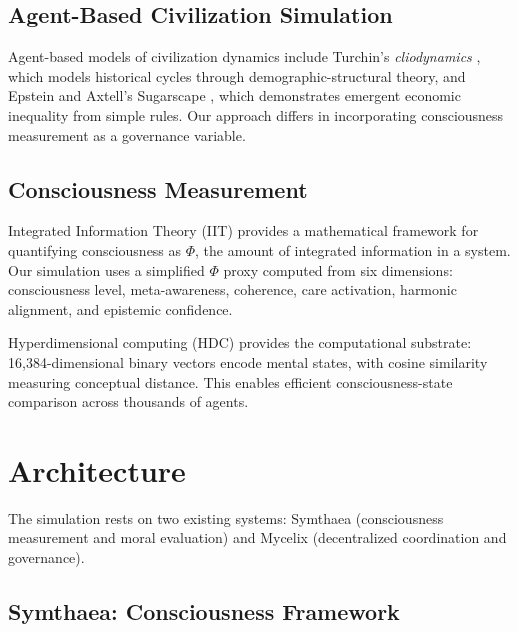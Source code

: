 \documentclass[12pt,a4paper]{article}
\begin{document}
\subsection{Agent-Based Civilization Simulation}

Agent-based models of civilization dynamics include Turchin's \emph{cliodynamics} \citep{turchin2003historical}, which models historical cycles through demographic-structural theory, and Epstein and Axtell's Sugarscape \citep{epstein1996growing}, which demonstrates emergent economic inequality from simple rules. Our approach differs in incorporating consciousness measurement as a governance variable.

\subsection{Consciousness Measurement}

Integrated Information Theory (IIT) \citep{tononi2004information, oizumi2014phenomenology} provides a mathematical framework for quantifying consciousness as $\Phi$, the amount of integrated information in a system. Our simulation uses a simplified $\Phi$ proxy computed from six dimensions: consciousness level, meta-awareness, coherence, care activation, harmonic alignment, and epistemic confidence.

Hyperdimensional computing (HDC) \citep{kanerva2009hyperdimensional} provides the computational substrate: 16,384-dimensional binary vectors encode mental states, with cosine similarity measuring conceptual distance. This enables efficient consciousness-state comparison across thousands of agents.


\section{Architecture}
\label{sec:architecture}

The simulation rests on two existing systems: Symthaea (consciousness measurement and moral evaluation) and Mycelix (decentralized coordination and governance).

\subsection{Symthaea: Consciousness Framework}
\end{document}
